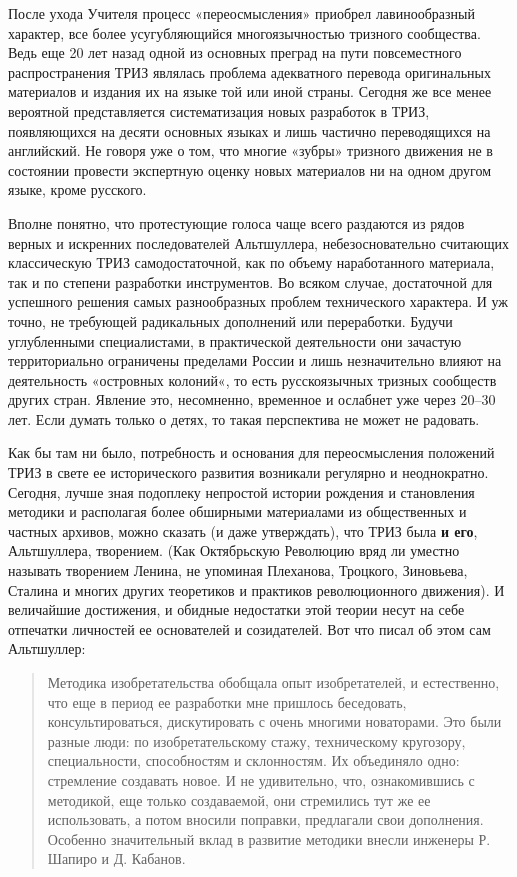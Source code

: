 \documentclass[11pt,a4paper]{article}
\begin{document}
После ухода Учителя процесс «переосмысления» приобрел лавинообразный характер,
все более усугубляющийся многоязычностью тризного сообщества. Ведь еще 20 лет
назад одной из основных преград на пути повсеместного распространения ТРИЗ
являлась проблема адекватного перевода оригинальных материалов и издания их на
языке той или иной страны. Сегодня же все менее вероятной представляется
систематизация новых разработок в ТРИЗ, появляющихся на десяти основных языках
и лишь частично переводящихся на английский. Не говоря уже о том, что многие
«зубры» тризного движения не в состоянии провести экспертную оценку новых
материалов ни на одном другом языке, кроме русского.

Вполне понятно, что протестующие голоса чаще всего раздаются из рядов верных и
искренних последователей Альтшуллера, небезосновательно считающих классическую
ТРИЗ самодостаточной, как по объему наработанного материала, так и по степени
разработки инструментов. Во всяком случае, достаточной для успешного решения
самых разнообразных проблем технического характера. И уж точно, не требующей
радикальных дополнений или переработки. Будучи углубленными специалистами, в
практической деятельности они зачастую территориально ограничены пределами
России и лишь незначительно влияют на деятельность «островных колоний«, то
есть русскоязычных тризных сообществ других стран. Явление это, несомненно,
временное и ослабнет уже через 20--30 лет. Если думать только о детях, то
такая перспектива не может не радовать.

Как бы там ни было, потребность и основания для переосмысления положений ТРИЗ
в свете ее исторического развития возникали регулярно и неоднократно. Сегодня,
лучше зная подоплеку непростой истории рождения и становления методики и
располагая более обширными материалами из общественных и частных архивов,
можно сказать (и даже утверждать), что ТРИЗ была \textbf{и его}, Альтшуллера,
творением.  (Как Октябрьскую Революцию вряд ли уместно называть творением
Ленина, не упоминая Плеханова, Троцкого, Зиновьева, Сталина и многих других
теоретиков и практиков революционного движения). И величайшие достижения, и
обидные недостатки этой теории несут на себе отпечатки личностей ее
основателей и созидателей. Вот что писал об этом сам Альтшуллер: 
\begin{quote}
  Методика изобретательства обобщала опыт изобретателей, и естественно, что
  еще в период ее разработки мне пришлось беседовать, консультироваться,
  дискутировать с очень многими новаторами. Это были разные люди: по
  изобретательскому стажу, техническому кругозору, специальности, способностям
  и склонностям. Их объединяло одно: стремление создавать новое. И не
  удивительно, что, ознакомившись с методикой, еще только создаваемой, они
  стремились тут же ее использовать, а потом вносили поправки, предлагали свои
  дополнения. Особенно значительный вклад в развитие методики внесли инженеры
  Р. Шапиро и Д. Кабанов. \cite{Altshuller1961}
\end{quote}
\end{document}
